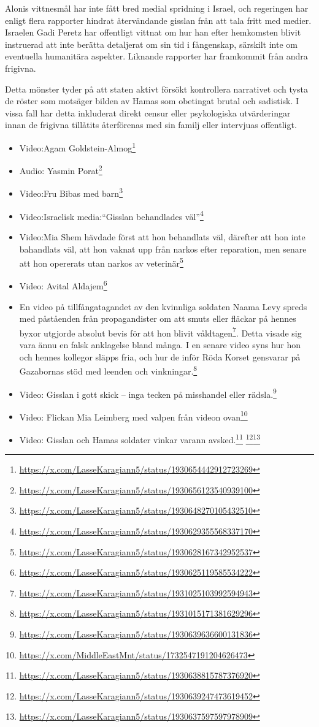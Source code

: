 Alonis vittnesmål har inte fått bred medial spridning i Israel, och regeringen har enligt flera rapporter hindrat återvändande gisslan från att tala fritt med medier. Israelen Gadi Peretz har offentligt vittnat om hur han efter hemkomsten blivit instruerad att inte berätta detaljerat om sin tid i fångenskap, särskilt inte om eventuella humanitära aspekter. Liknande rapporter har framkommit från andra frigivna.

Detta mönster tyder på att staten aktivt försökt kontrollera narrativet och tysta de röster som motsäger bilden av Hamas som obetingat brutal och sadistisk. I vissa fall har detta inkluderat direkt censur eller psykologiska utvärderingar innan de frigivna tillåtits återförenas med sin familj eller intervjuas offentligt.

\begin{itemize}
\item Video:Agam Goldstein-Almog\footnote{\url{https://x.com/LasseKaragiann5/status/1930654442912723269}}
\item Audio: Yasmin Porat\footnote{\url{https://x.com/LasseKaragiann5/status/1930656123540939100}}
\item Video:Fru Bibas med barn\footnote{\url{https://x.com/LasseKaragiann5/status/1930648270105432510}}
\item Video:Israelisk media:\enquote{Gisslan behandlades väl}\footnote{\url{https://x.com/LasseKaragiann5/status/1930629355568337170}}
\item Video:Mia Shem hävdade först att hon behandlats väl, därefter att hon inte bahandlats väl, att hon vaknat upp från narkos efter reparation, men senare att hon opererats utan narkos av veterinär\footnote{\url{https://x.com/LasseKaragiann5/status/1930628167342952537}}
\item Video: Avital Aldajem\footnote{\url{https://x.com/LasseKaragiann5/status/1930625119585534222}}
\item En video på tillfångatagandet av den kvinnliga soldaten Naama Levy spreds med påståenden från propagandister om att smuts eller fläckar på hennes byxor utgjorde absolut bevis för att hon blivit våldtagen\footnote{\url{https://x.com/LasseKaragiann5/status/1931025103992594943}}. Detta visade sig vara ännu en falsk anklagelse bland många. I en senare video syns hur hon och hennes kollegor släpps fria, och hur de inför Röda Korset gensvarar på Gazabornas stöd med leenden och vinkningar.\footnote{\url{https://x.com/LasseKaragiann5/status/1931015171381629296}}

\item Video: Gisslan i gott skick – inga tecken på misshandel eller rädsla.\footnote{\url{https://x.com/LasseKaragiann5/status/1930639636600131836}}
\item Video: Flickan Mia Leimberg med valpen från videon ovan\footnote{\url{https://x.com/MiddleEastMnt/status/1732547191204626473}}
\item Video: Gisslan och Hamas soldater vinkar varann avsked.\footnote{\url{https://x.com/LasseKaragiann5/status/1930638815787376920}} \footnote{\url{https://x.com/LasseKaragiann5/status/1930639247473619452}}\footnote{\url{https://x.com/LasseKaragiann5/status/1930637597597978909}}


\end{itemize}
